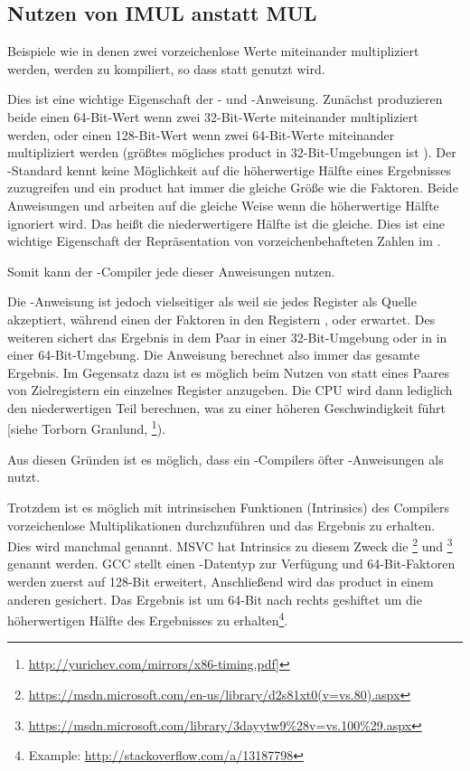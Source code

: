 \subsection{Nutzen von IMUL anstatt MUL}
\label{IMUL_over_MUL}

Beispiele wie  in denen zwei vorzeichenlose Werte miteinander multipliziert
werden, werden zu  kompiliert, so dass \IMUL statt \MUL genutzt wird.

Dies ist eine wichtige Eigenschaft der \MUL- und \IMUL-Anweisung.
Zunächst produzieren beide einen 64-Bit-Wert wenn zwei 32-Bit-Werte miteinander multipliziert werden,
oder einen 128-Bit-Wert wenn zwei 64-Bit-Werte miteinander multipliziert werden (größtes mögliches \gls{product}
in 32-Bit-Umgebungen ist ).
Der \CCpp-Standard kennt keine Möglichkeit auf die höherwertige Hälfte eines Ergebnisses zuzugreifen
und ein \gls{product} hat immer die gleiche Größe wie die Faktoren. %
Beide Anweisungen \MUL und \IMUL arbeiten auf die gleiche Weise wenn die höherwertige Hälfte ignoriert wird.
Das heißt die niederwertigere Hälfte ist die gleiche.
Dies ist eine wichtige Eigenschaft der Repräsentation von vorzeichenbehafteten Zahlen im .

Somit kann der \CCpp-Compiler jede dieser Anweisungen nutzen.

Die \IMUL-Anweisung ist jedoch vielseitiger als \MUL weil sie jedes Register als Quelle akzeptiert,
während \MUL einen der Faktoren in den Registern \AX, \EAX oder \RAX erwartet.
Des weiteren sichert \MUL das Ergebnis in dem  Paar in einer 32-Bit-Umgebung oder
in  in einer 64-Bit-Umgebung. Die Anweisung berechnet also immer das gesamte Ergebnis.
Im Gegensatz dazu ist es möglich beim Nutzen von \IMUL statt eines Paares von Zielregistern ein
einzelnes Register anzugeben. Die \ac{CPU} wird dann lediglich den niederwertigen Teil berechnen,
was zu einer höheren Geschwindigkeit führt [siehe Torborn Granlund, \footnote{\url{http://yurichev.com/mirrors/x86-timing.pdf}]}).

Aus diesen Gründen ist es möglich, dass ein \CCpp-Compilers öfter \IMUL-Anweisungen als \MUL nutzt.

Trotzdem ist es möglich mit intrinsischen Funktionen (Intrinsics) des Compilers vorzeichenlose Multiplikationen durchzuführen
und das  Ergebnis zu erhalten.
Dies wird manchmal  genannt.
MSVC hat Intrinsics zu diesem Zweck die \footnote{\url{https://msdn.microsoft.com/en-us/library/d2s81xt0(v=vs.80).aspx}}
und \footnote{\url{https://msdn.microsoft.com/library/3dayytw9%28v=vs.100%29.aspx}} genannt werden.
GCC stellt einen -Datentyp zur Verfügung und 64-Bit-Faktoren werden zuerst auf 128-Bit erweitert,
Anschließend wird das \gls{product} in einem anderen  gesichert.
Das Ergebnis ist um 64-Bit nach rechts geshiftet um die höherwertigen Hälfte des Ergebnisses
zu erhalten\footnote{Example: \url{http://stackoverflow.com/a/13187798}}.

